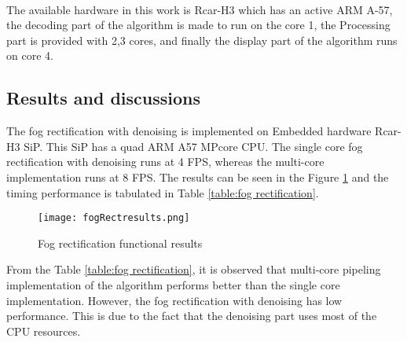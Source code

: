 \paragraph*{}The available hardware in this work is Rcar-H3 which has an active ARM A-57, the decoding part of the algorithm is made to run on the core 1, the Processing part is provided with 2,3 cores, and finally the display part of the algorithm runs on core 4. 
\subsection{Results and discussions}
The fog rectification with denoising is implemented on Embedded hardware Rcar-H3 SiP. This SiP has a quad ARM A57 MPcore CPU. The single core fog rectification with denoising runs at 4 FPS, whereas the multi-core implementation runs at 8 FPS. The results can be seen in the Figure \ref{fig:Fog rectification results} and the timing performance is tabulated in Table \ref{table:fog rectification}.
\begin{figure}[htb]
	\centering
	\texttt{[image: fogRectresults.png]}
	\caption{Fog rectification functional results}
	\label{fig:Fog rectification results}
\end{figure}
From the Table \ref{table:fog rectification}, it is observed that multi-core pipeling implementation of the algorithm performs better than the single core implementation. However, the fog rectification with denoising  has low performance. This is due to the fact that the denoising part uses most of the CPU resources.
\begin{table}[htb]
\caption{Fog rectification algorithm timing performance}
\label{table:fog rectification}
\end{table}
